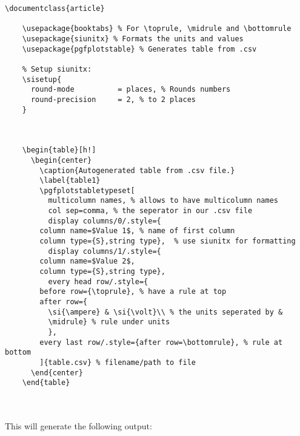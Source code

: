   \begin{lstlisting}[language={[LaTeX]TeX},breaklines=true,frame=single]
    \documentclass{article}

    \usepackage{booktabs} % For \toprule, \midrule and \bottomrule
    \usepackage{siunitx} % Formats the units and values
    \usepackage{pgfplotstable} % Generates table from .csv
    
    % Setup siunitx:
    \sisetup{
      round-mode          = places, % Rounds numbers
      round-precision     = 2, % to 2 places
    }
    
    
    
    \begin{table}[h!]
      \begin{center}
        \caption{Autogenerated table from .csv file.}
        \label{table1}
        \pgfplotstabletypeset[
          multicolumn names, % allows to have multicolumn names
          col sep=comma, % the seperator in our .csv file
          display columns/0/.style={
        column name=$Value 1$, % name of first column
        column type={S},string type},  % use siunitx for formatting
          display columns/1/.style={
        column name=$Value 2$,
        column type={S},string type},
          every head row/.style={
        before row={\toprule}, % have a rule at top
        after row={
          \si{\ampere} & \si{\volt}\\ % the units seperated by &
          \midrule} % rule under units
          },
        every last row/.style={after row=\bottomrule}, % rule at bottom
        ]{table.csv} % filename/path to file
      \end{center}
    \end{table}
    
    
  \end{lstlisting}

  \paragraph{}
  This will generate the following output:

